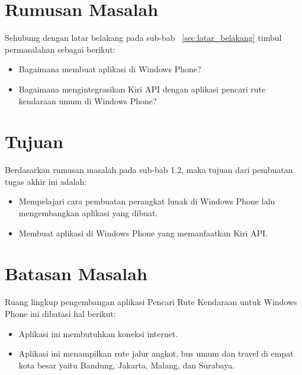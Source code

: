 \section{Rumusan Masalah}
\label{sec:rumusan_masalah}
Sehubung dengan latar belakang pada sub-bab ~\ref{sec:latar_belakang} timbul permasalahan sebagai berikut:
\begin{itemize}
	\item Bagaimana membuat aplikasi di Windows Phone?
	\item Bagaimana mengintegrasikan Kiri API dengan aplikasi pencari rute kendaraan umum di Windows Phone?
\end{itemize}

\section{Tujuan}
\label{sec:tujuan}
Berdasarkan rumusan masalah pada sub-bab 1.2, maka tujuan dari pembuatan tugas akhir ini adalah:
\begin{itemize}
	\item Mempelajari cara pembuatan perangkat lunak di Windows Phone lalu mengembangkan aplikasi yang dibuat.
	\item Membuat aplikasi di Windows Phone yang memanfaatkan Kiri API.
\end{itemize}

\section{Batasan Masalah}
\label{sec:batasan_masalah}
Ruang lingkup pengembangan aplikasi Pencari Rute Kendaraan untuk Windows Phone ini dibatasi hal berikut:
\begin{itemize}
	\item Aplikasi ini membutuhkan koneksi internet.
	\item Aplikasi ini menampilkan rute jalur angkot, bus umum dan travel di empat kota besar yaitu Bandung, Jakarta, Malang, dan Surabaya.  
\end{itemize}

